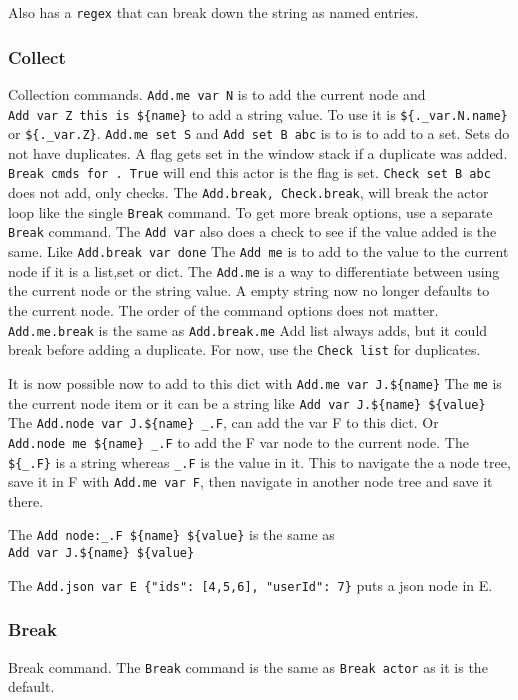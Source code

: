 \documentclass[11pt]{article}
\begin{document}
Also has a \texttt{regex} that can break down the string as named
entries.

\subsubsection{Collect}
Collection commands.
\texttt{Add.me\ var\ N} is to add the current node and
\texttt{Add\ var\ Z\ this\ is\ \$\{name\}} to add a string value. To use
it is \texttt{\$\{.\_var.N.name\}} or \texttt{\$\{.\_var.Z\}}.
\texttt{Add.me\ set\ S} and \texttt{Add\ set\ B\ abc} is to is to add to
a set. Sets do not have duplicates. A flag gets set in the window stack
if a duplicate was added. \texttt{Break\ cmds\ for\ .\ True} will end
this actor is the flag is set. \texttt{Check\ set\ B\ abc} does not add,
only checks. The \texttt{Add.break,\ Check.break}, will break the actor
loop like the single \texttt{Break} command. To get more break options,
use a separate \texttt{Break} command. The \texttt{Add\ var} also does a
check to see if the value added is the same. Like
\texttt{Add.break\ var\ done} The \texttt{Add\ me} is to add to the
value to the current node if it is a list,set or dict. The
\texttt{Add.me} is a way to differentiate between using the current node
or the string value. A empty string now no longer defaults to the
current node. The order of the command options does not matter.
\texttt{Add.me.break} is the same as \texttt{Add.break.me} Add list
always adds, but it could break before adding a duplicate. For now, use
the \texttt{Check\ list} for duplicates.

It is now possible now to add to this dict with
\texttt{Add.me\ var\ J.\$\{name\}} The \texttt{me} is the current node
item or it can be a string like
\texttt{Add\ var\ J.\$\{name\}\ \$\{value\}} The
\texttt{Add.node\ var\ J.\$\{name\}\ \_.F}, can add the var F to this
dict. Or \texttt{Add.node\ me\ \$\{name\}\ \_.F} to add the F var node
to the current node. The \texttt{\$\{\_.F\}} is a string whereas
\texttt{\_.F} is the value in it. This to navigate the a node tree, save
it in F with \texttt{Add.me\ var\ F}, then navigate in another node tree
and save it there.

The \texttt{Add\ node:\_.F\ \$\{name\}\ \$\{value\}} is the same as
\texttt{Add\ var\ J.\$\{name\}\ \$\{value\}}

The \texttt{Add.json\ var\ E\ \{"ids":\ {[}4,5,6{]},\ "userId":\ 7\}}
puts a json node in E.

\subsubsection{Break}
Break command.
The \texttt{Break} command is the same as \texttt{Break\ actor} as it is
the default.
\end{document}
